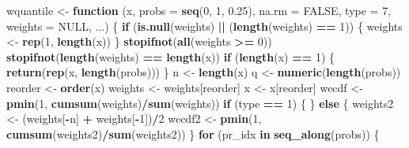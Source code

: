 \documentclass[
]{article}
\newenvironment{Shaded}{\begin{snugshade}}{\end{snugshade}}
\newcommand{\AttributeTok}[1]{\textcolor[rgb]{0.13,0.29,0.53}{#1}}
\newcommand{\ConstantTok}[1]{\textcolor[rgb]{0.56,0.35,0.01}{#1}}
\newcommand{\ControlFlowTok}[1]{\textcolor[rgb]{0.13,0.29,0.53}{\textbf{#1}}}
\newcommand{\DecValTok}[1]{\textcolor[rgb]{0.00,0.00,0.81}{#1}}
\newcommand{\FloatTok}[1]{\textcolor[rgb]{0.00,0.00,0.81}{#1}}
\newcommand{\FunctionTok}[1]{\textcolor[rgb]{0.13,0.29,0.53}{\textbf{#1}}}
\newcommand{\NormalTok}[1]{#1}
\newcommand{\OtherTok}[1]{\textcolor[rgb]{0.56,0.35,0.01}{#1}}
\newcommand{\SpecialCharTok}[1]{\textcolor[rgb]{0.81,0.36,0.00}{\textbf{#1}}}
\begin{document}
\begin{Shaded}
\begin{Highlighting}[]
\NormalTok{wquantile }\OtherTok{\textless{}{-}} \ControlFlowTok{function}\NormalTok{ (x, }\AttributeTok{probs =} \FunctionTok{seq}\NormalTok{(}\DecValTok{0}\NormalTok{, }\DecValTok{1}\NormalTok{, }\FloatTok{0.25}\NormalTok{), }\AttributeTok{na.rm =} \ConstantTok{FALSE}\NormalTok{, }\AttributeTok{type =} \DecValTok{7}\NormalTok{, }
                       \AttributeTok{weights =} \ConstantTok{NULL}\NormalTok{, ...) }
\NormalTok{\{}
  \ControlFlowTok{if}\NormalTok{ (}\FunctionTok{is.null}\NormalTok{(weights) }\SpecialCharTok{||}\NormalTok{ (}\FunctionTok{length}\NormalTok{(weights) }\SpecialCharTok{==} \DecValTok{1}\NormalTok{)) \{}
\NormalTok{    weights }\OtherTok{\textless{}{-}} \FunctionTok{rep}\NormalTok{(}\DecValTok{1}\NormalTok{, }\FunctionTok{length}\NormalTok{(x))}
\NormalTok{  \}}
  \FunctionTok{stopifnot}\NormalTok{(}\FunctionTok{all}\NormalTok{(weights }\SpecialCharTok{\textgreater{}=} \DecValTok{0}\NormalTok{))}
  \FunctionTok{stopifnot}\NormalTok{(}\FunctionTok{length}\NormalTok{(weights) }\SpecialCharTok{==} \FunctionTok{length}\NormalTok{(x))}
  \ControlFlowTok{if}\NormalTok{ (}\FunctionTok{length}\NormalTok{(x) }\SpecialCharTok{==} \DecValTok{1}\NormalTok{) \{}
    \FunctionTok{return}\NormalTok{(}\FunctionTok{rep}\NormalTok{(x, }\FunctionTok{length}\NormalTok{(probs)))}
\NormalTok{  \}}
\NormalTok{  n }\OtherTok{\textless{}{-}} \FunctionTok{length}\NormalTok{(x)}
\NormalTok{  q }\OtherTok{\textless{}{-}} \FunctionTok{numeric}\NormalTok{(}\FunctionTok{length}\NormalTok{(probs))}
\NormalTok{  reorder }\OtherTok{\textless{}{-}} \FunctionTok{order}\NormalTok{(x)}
\NormalTok{  weights }\OtherTok{\textless{}{-}}\NormalTok{ weights[reorder]}
\NormalTok{  x }\OtherTok{\textless{}{-}}\NormalTok{ x[reorder]}
\NormalTok{  wecdf }\OtherTok{\textless{}{-}} \FunctionTok{pmin}\NormalTok{(}\DecValTok{1}\NormalTok{, }\FunctionTok{cumsum}\NormalTok{(weights)}\SpecialCharTok{/}\FunctionTok{sum}\NormalTok{(weights))}
  \ControlFlowTok{if}\NormalTok{ (type }\SpecialCharTok{==} \DecValTok{1}\NormalTok{) \{}
\NormalTok{  \}}
  \ControlFlowTok{else}\NormalTok{ \{}
\NormalTok{    weights2 }\OtherTok{\textless{}{-}}\NormalTok{ (weights[}\SpecialCharTok{{-}}\NormalTok{n] }\SpecialCharTok{+}\NormalTok{ weights[}\SpecialCharTok{{-}}\DecValTok{1}\NormalTok{])}\SpecialCharTok{/}\DecValTok{2}
\NormalTok{    wecdf2 }\OtherTok{\textless{}{-}} \FunctionTok{pmin}\NormalTok{(}\DecValTok{1}\NormalTok{, }\FunctionTok{cumsum}\NormalTok{(weights2)}\SpecialCharTok{/}\FunctionTok{sum}\NormalTok{(weights2))}
\NormalTok{  \}}
  \ControlFlowTok{for}\NormalTok{ (pr\_idx }\ControlFlowTok{in} \FunctionTok{seq\_along}\NormalTok{(probs)) \{}

\end{Highlighting}
\end{Shaded}
\end{document}
